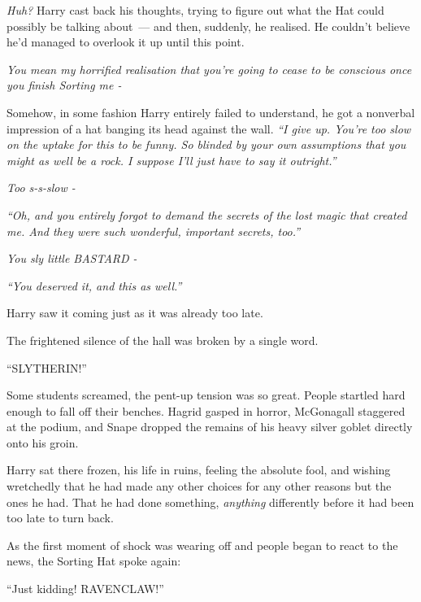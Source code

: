 \emph{Huh?} Harry cast back his thoughts, trying to figure out what the Hat could possibly be talking about~--- and then, suddenly, he realised. He couldn't believe he'd managed to overlook it up until this point.

\emph{You mean my horrified realisation that you're going to cease to be conscious once you finish Sorting me -}

Somehow, in some fashion Harry entirely failed to understand, he got a nonverbal impression of a hat banging its head against the wall. \emph{``I give up. You're too slow on the uptake for this to be funny. So blinded by your own assumptions that you might as well be a rock. I suppose I'll just have to say it outright.''}

\emph{Too s-s-slow -}

\emph{``Oh, and you entirely forgot to demand the secrets of the lost magic that created me. And they were such wonderful, important secrets, too.''}

\emph{You sly little BASTARD -}

\emph{``You deserved it, and this as well.''}

Harry saw it coming just as it was already too late.

The frightened silence of the hall was broken by a single word.

``SLYTHERIN!''

Some students screamed, the pent-up tension was so great. People startled hard enough to fall off their benches. Hagrid gasped in horror, McGonagall staggered at the podium, and Snape dropped the remains of his heavy silver goblet directly onto his groin.

Harry sat there frozen, his life in ruins, feeling the absolute fool, and wishing wretchedly that he had made any other choices for any other reasons but the ones he had. That he had done something, \emph{anything} differently before it had been too late to turn back.

As the first moment of shock was wearing off and people began to react to the news, the Sorting Hat spoke again:

``Just kidding! RAVENCLAW!''

